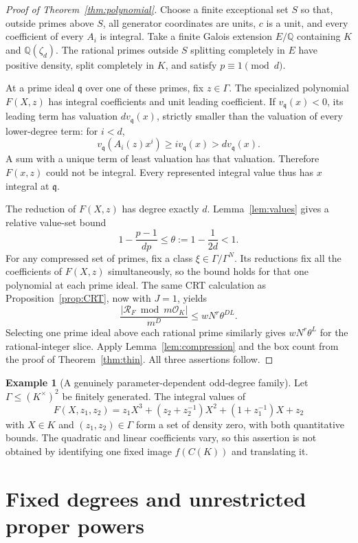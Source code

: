 \documentclass[11pt,a4paper]{article}
\theoremstyle{definition}
\newtheorem{example}[theorem]{Example}
\theoremstyle{remark}
\newcommand{\Q}{\mathbb Q}
\newcommand{\OK}{\mathcal O_K}
\newcommand{\cR}{\mathcal R}
\begin{document}
\begin{proof}[Proof of Theorem~\ref{thm:polynomial}]
Choose a finite exceptional set $S$ so that, outside primes above $S$,
all generator coordinates are units, $c$ is a unit, and every
coefficient of every $A_i$ is integral. Take a finite Galois extension
$E/\Q$ containing $K$ and $\Q(\zeta_d)$. The rational primes outside
$S$ splitting completely in $E$ have positive density, split completely
in $K$, and satisfy $p\equiv1\pmod d$.

At a prime ideal $\mathfrak q$ over one of these primes, fix $z\in\Gamma$.
The specialized polynomial $F(X,z)$ has integral coefficients and unit
leading coefficient. If $v_{\mathfrak q}(x)<0$, its leading term has
valuation $d v_{\mathfrak q}(x)$, strictly smaller than the valuation of
every lower-degree term: for $i<d$,
\[
 v_{\mathfrak q}(A_i(z)x^i)\ge i v_{\mathfrak q}(x)
       >d v_{\mathfrak q}(x).
\]
A sum with a unique term of least valuation has that valuation. Therefore
$F(x,z)$ could not be integral. Every represented integral value thus
has $x$ integral at $\mathfrak q$.

The reduction of $F(X,z)$ has degree exactly $d$.
Lemma~\ref{lem:values} gives a relative value-set bound
\[
 1-\frac{p-1}{dp}\le\theta:=1-\frac1{2d}<1.
\]
For any compressed set of primes, fix a class
$\xi\in\Gamma/\Gamma^N$. Its reductions fix all the coefficients of
$F(X,z)$ simultaneously, so the bound holds for that one polynomial at
each prime ideal. The same CRT calculation as
Proposition~\ref{prop:CRT}, now with $J=1$, yields
\[
 \frac{|\cR_F\bmod m\OK|}{m^D}\le wN^r\theta^{DL}.
\]
Selecting one prime ideal above each rational prime similarly gives
$wN^r\theta^L$ for the rational-integer slice. Apply
Lemma~\ref{lem:compression} and the box count from the proof of
Theorem~\ref{thm:thin}. All three assertions follow.
\end{proof}

\begin{example}[A genuinely parameter-dependent odd-degree family]
Let $\Gamma\le(K^\times)^2$ be finitely generated. The integral values of
\[
 F(X,z_1,z_2)=z_1X^3+(z_2+z_2^{-1})X^2+(1+z_1^{-1})X+z_2
\]
with $X\in K$ and $(z_1,z_2)\in\Gamma$ form a set of density zero,
with both quantitative bounds. The quadratic and linear coefficients
vary, so this assertion is not obtained by identifying one fixed image
$f(C(K))$ and translating it.
\end{example}

\section{Fixed degrees and unrestricted proper powers}\label{sec:degrees}
\end{document}
